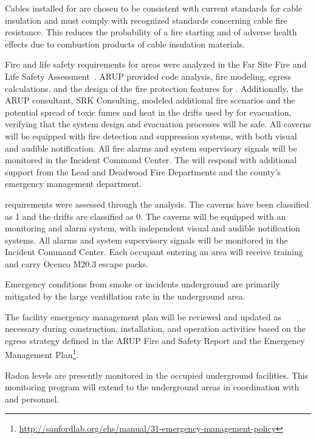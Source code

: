 Cables installed for  are chosen to be
consistent with current \fnal standards for cable insulation and must
comply with recognized standards concerning cable fire resistance. 
This reduces the probability of a fire starting and of adverse health effects due to
combustion products of cable insulation materials.

Fire and life safety requirements for  areas were
analyzed in the  Far Site Fire and Life Safety
  Assessment~. ARUP provided code analysis, fire
modeling, egress calculations, and the design of the fire protection
features for  .  Additionally, the ARUP
consultant, SRK Consulting, modeled additional fire scenarios and the potential
spread of toxic fumes and heat in the drifts used by
 for evacuation, verifying that the system design and evacuation 
    processes will be safe.   All caverns will be equipped with
fire detection and suppression systems, with both visual and audible
notification.  All fire alarms and system supervisory signals will be
monitored in the  Incident Command Center.  The
  will respond with additional support from the
Lead and Deadwood Fire Departments and the county's emergency management
department.

 requirements were assessed through the 
 analysis. The caverns have been classified as  1 and
the drifts are classified as   0. The caverns will be equipped with
an  monitoring and alarm system, with independent visual and
audible notification systems.  All  alarms and system
supervisory signals will be monitored in the  Incident
Command Center.  Each occupant entering an   area will receive  
training and carry Ocenco M20.3 escape packs.

Emergency conditions from smoke or  incidents underground are
primarily mitigated by the large ventillation rate in the 
underground area.

The facility emergency management plan will be reviewed and updated as
necessary during construction, installation, and operation activities
based on the egress strategy defined in the ARUP Fire and Safety
Report and the   Emergency Management
  Plan\footnote{\url{http://sanfordlab.org/ehs/manual/31-emergency-management-policy}}.

Radon levels are presently monitored in the occupied underground
facilities. This monitoring program will extend to the 
underground areas in coordination with  and 
 personnel.

